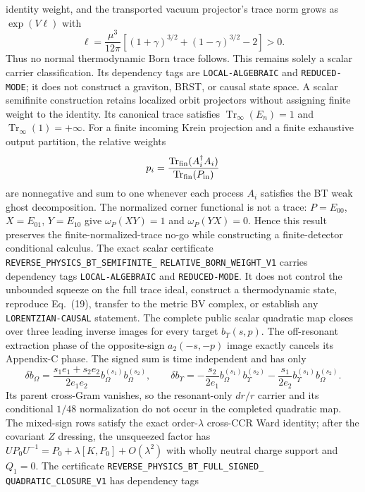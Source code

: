 \documentclass[11pt]{article}
\theoremstyle{definition}
\theoremstyle{remark}
\begin{document}
identity weight, and the transported vacuum projector's trace norm grows as
$\exp(V\ell)$ with
\[
 \ell=\frac{\mu^3}{12\pi}\left[
 (1+\gamma)^{3/2}+(1-\gamma)^{3/2}-2\right]>0.
\]
Thus no normal thermodynamic Born trace follows.  This remains solely a scalar
carrier classification.  Its dependency tags are \texttt{LOCAL-ALGEBRAIC}
and \texttt{REDUCED-MODE}; it does not construct a graviton, BRST, or causal
state space.
A scalar semifinite construction retains localized orbit projectors without
assigning finite weight to the identity.  Its canonical trace satisfies
$\operatorname{Tr}_{\!\infty}(E_n)=1$ and
$\operatorname{Tr}_{\!\infty}(1)=+\infty$.  For a finite incoming Krein
projection and a finite exhaustive output partition, the relative weights
\[
 p_i=\frac{\operatorname{Tr}_{\rm fin}(A_i^\dagger A_i)}
 {\operatorname{Tr}_{\rm fin}(P_{\rm in})}
\]
are nonnegative and sum to one whenever each process $A_i$ satisfies the BT
weak ghost decomposition.  The normalized corner functional is not a trace:
$P=E_{00}$, $X=E_{01}$, $Y=E_{10}$ give
$\omega_P(XY)=1$ and $\omega_P(YX)=0$.  Hence this result preserves the
finite-normalized-trace no-go while constructing a finite-detector conditional
calculus.  The exact scalar certificate
\texttt{REVERSE\_PHYSICS\_BT\_SEMIFINITE\_}
\allowbreak\texttt{RELATIVE\_BORN\_WEIGHT\_V1} carries dependency tags
\texttt{LOCAL-ALGEBRAIC} and \texttt{REDUCED-MODE}.  It does not control the
unbounded squeeze on the full trace ideal, construct a thermodynamic state,
reproduce Eq.~(19), transfer to the metric BV complex, or establish any
\texttt{LORENTZIAN-CAUSAL} statement.
The complete public scalar quadratic map closes over three leading inverse
images for every target $b_\Upsilon(s,p)$.  The off-resonant extraction phase
of the opposite-sign $a_2(-s,-p)$ image exactly cancels its Appendix-C phase.
The signed sum is time independent and has only
\[
 \delta b_\Omega=
 \frac{s_1e_1+s_2e_2}{2e_1e_2}
 b_\Omega^{(s_1)}b_\Omega^{(s_2)},
 \qquad
 \delta b_\Upsilon=-\frac{s_2}{2e_1}
 b_\Omega^{(s_1)}b_\Upsilon^{(s_2)}
 -\frac{s_1}{2e_2}
 b_\Upsilon^{(s_1)}b_\Omega^{(s_2)}.
\]
Its parent cross-Gram vanishes, so the resonant-only $dr/r$ carrier and its
conditional $1/48$ normalization do not occur in the completed quadratic
map.  The mixed-sign rows satisfy the exact order-$\lambda$ cross-CCR Ward
identity; after the covariant $Z$ dressing, the unsqueezed factor has
$U P_0U^{-1}=P_0+\lambda[K,P_0]+O(\lambda^2)$ with wholly neutral charge
support and $Q_1=0$.  The certificate
\texttt{REVERSE\_PHYSICS\_BT\_FULL\_SIGNED\_}
\allowbreak\texttt{QUADRATIC\_CLOSURE\_V1} has dependency tags
\end{document}
